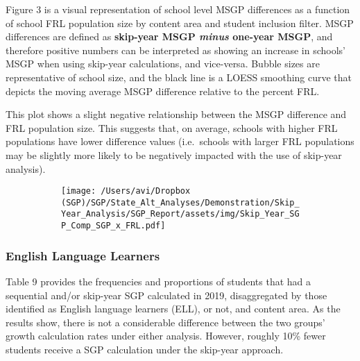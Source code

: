 \documentclass[12pt]{article}
\begin{document}
Figure 3 is a visual representation of school level MSGP differences as
a function of school FRL population size by content area and student
inclusion filter. MSGP differences are defined as \textbf{skip-year MSGP
\emph{minus} one-year MSGP}, and therefore positive numbers can be
interpreted as showing an increase in schools' MSGP when using skip-year
calculations, and vice-versa. Bubble sizes are representative of school
size, and the black line is a LOESS smoothing curve that depicts the
moving average MSGP difference relative to the percent FRL.

This plot shows a slight negative relationship between the MSGP
difference and FRL population size. This suggests that, on average,
schools with higher FRL populations have lower difference values
(i.e.~schools with larger FRL populations may be slightly more likely to
be negatively impacted with the use of skip-year analysis).

\begin{figure}[H]
\caption*{{{\bf{Figure 3:}} } Mean SGP difference by percent FRL by content area and student inclusion filter}
  \begin{subfigure}[b]{1\textwidth}
    \texttt{[image: /Users/avi/Dropbox (SGP)/SGP/State\_Alt\_Analyses/Demonstration/Skip\_Year\_Analysis/SGP\_Report/assets/img/Skip\_Year\_SGP\_Comp\_SGP\_x\_FRL.pdf]}
  \end{subfigure}
\end{figure}

\hypertarget{english-language-learners}{%
\subsubsection{English Language
Learners}\label{english-language-learners}}

Table 9 provides the frequencies and proportions of students that had a
sequential and/or skip-year SGP calculated in 2019, disaggregated by
those identified as English language learners (ELL), or not, and content
area. As the results show, there is not a considerable difference
between the two groups' growth calculation rates under either analysis.
However, roughly 10\% fewer students receive a SGP calculation under the
skip-year approach.
\end{document}
